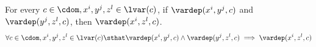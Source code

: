 %
\begin{lem}
	\label{lem:vardep_trans}
For every $c \in \cdom, x^i, y^j, z^l \in \lvar(c)$, 
if $\vardep(x^i, y^j, c)$ and 
$\vardep(y^j, z^l, c)$, then $\vardep(x^i, z^l, c)$.
	\[
	\forall c \in \cdom, x^i, y^j, z^l \in \lvar(c) \sthat  
	\vardep(x^i, y^j, c) 
	\land
	\vardep(y^j, z^l, c) 
	\implies
	\vardep(x^i, z^l, c)
	\]
  \end{lem}
%
